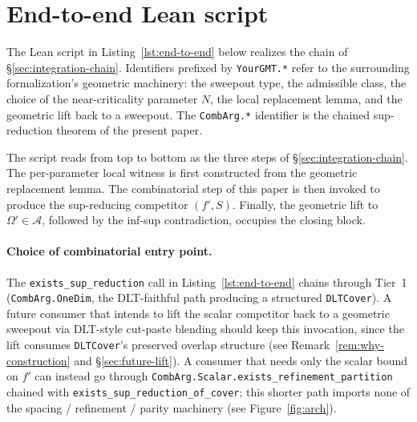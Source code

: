 \section{End-to-end Lean script}
\label{app:lean-script}

The Lean script in Listing~\ref{lst:end-to-end} below realizes
the chain of \S\ref{sec:integration-chain}. Identifiers prefixed
by \texttt{YourGMT.*} refer to the surrounding formalization's
geometric machinery: the sweepout type, the admissible class,
the choice of the near-criticality parameter $N$, the local
replacement lemma, and the geometric lift back to a sweepout.
The \texttt{CombArg.*} identifier is the chained sup-reduction
theorem of the present paper.

The script reads from top to bottom as the three steps of
\S\ref{sec:integration-chain}. The per-parameter local witness
is first constructed from the geometric replacement lemma. The
combinatorial step of this paper is then invoked to produce the
sup-reducing competitor $(f', S)$. Finally, the geometric lift
to $\Omega' \in \mathcal{A}$, followed by the inf-sup
contradiction, occupies the closing block.

\paragraph{Choice of combinatorial entry point.}
The \texttt{exists\_sup\_reduction} call in
Listing~\ref{lst:end-to-end} chains through Tier~1
(\texttt{CombArg.OneDim}, the DLT-faithful path producing a
structured \texttt{DLTCover}). A future consumer that intends to
lift the scalar competitor back to a geometric sweepout via
DLT-style cut-paste blending should keep this invocation, since
the lift consumes \texttt{DLTCover}'s preserved overlap structure
(see Remark~\ref{rem:why-construction} and \S\ref{sec:future-lift}).
A consumer that needs only the scalar bound on $f'$ can instead
go through \texttt{CombArg.Scalar.exists\_refinement\_partition}
chained with \texttt{exists\_sup\_reduction\_of\_cover}; this
shorter path imports none of the spacing / refinement / parity
machinery (see Figure~\ref{fig:arch}).

